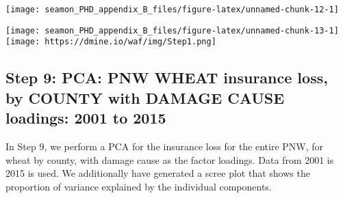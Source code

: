 \documentclass[]{article}
\newenvironment{Shaded}{\begin{snugshade}}{\end{snugshade}}
\newcommand{\CommentTok}[1]{\textcolor[rgb]{0.56,0.35,0.01}{\textit{#1}}}
\newcommand{\DataTypeTok}[1]{\textcolor[rgb]{0.13,0.29,0.53}{#1}}
\newcommand{\DecValTok}[1]{\textcolor[rgb]{0.00,0.00,0.81}{#1}}
\newcommand{\KeywordTok}[1]{\textcolor[rgb]{0.13,0.29,0.53}{\textbf{#1}}}
\newcommand{\NormalTok}[1]{#1}
\newcommand{\OperatorTok}[1]{\textcolor[rgb]{0.81,0.36,0.00}{\textbf{#1}}}
\newcommand{\StringTok}[1]{\textcolor[rgb]{0.31,0.60,0.02}{#1}}
\begin{document}
\texttt{[image: seamon\_PHD\_appendix\_B\_files/figure-latex/unnamed-chunk-12-1]}

\begin{Shaded}
\end{Shaded}

\texttt{[image: seamon\_PHD\_appendix\_B\_files/figure-latex/unnamed-chunk-13-1]}
\texttt{[image: https://dmine.io/waf/img/Step1.png]}

\hypertarget{step-9-pca-pnw-wheat-insurance-loss-by-county-with-damage-cause-loadings-2001-to-2015}{%
\subsection{Step 9: PCA: PNW WHEAT insurance loss, by COUNTY with DAMAGE
CAUSE loadings: 2001 to
2015}\label{step-9-pca-pnw-wheat-insurance-loss-by-county-with-damage-cause-loadings-2001-to-2015}}

In Step 9, we perform a PCA for the insurance loss for the entire PNW,
for wheat by county, with damage cause as the factor loadings. Data from
2001 is 2015 is used. We additionally have generated a scree plot that
shows the proportion of variance explained by the individual components.
\end{document}
